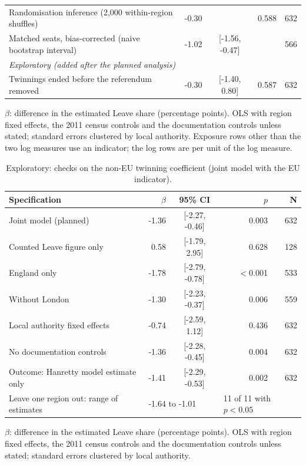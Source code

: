 \documentclass[11pt,a4paper]{article}
\begin{document}
\begin{table}[H]
\begin{threeparttable}
\begin{tabular}{p{8.2cm}rcrr}
Randomisation inference (2,000 within-region shuffles) & -0.30 & & 0.588 & 632\\
Matched seats, bias-corrected (naive bootstrap interval) & -1.02 & [-1.56, -0.47] & & 566\\
\midrule\multicolumn{5}{l}{\textit{Exploratory (added after the planned analysis)}}\\
Twinnings ended before the referendum removed & -0.30 & [-1.40, 0.80] & 0.587 & 632\\
\bottomrule\end{tabular}\begin{tablenotes}\footnotesize\item $\beta$: difference in the estimated Leave share (percentage points). OLS with region fixed effects, the 2011 census controls and the documentation controls unless stated; standard errors clustered by local authority. Exposure rows other than the two log measures use an indicator; the log rows are per unit of the log measure.\end{tablenotes}\end{threeparttable}\end{table}

\begin{table}[H]\centering\footnotesize\begin{threeparttable}\caption{Exploratory: checks on the non-EU twinning coefficient (joint model with the EU indicator).}\label{tab:noneu}\begin{tabular}{p{8.2cm}rcrr}\toprule Specification & $\beta$ & 95\% CI & $p$ & N\\\midrule
Joint model (planned) & -1.36 & [-2.27, -0.46] & 0.003 & 632\\
Counted Leave figure only & 0.58 & [-1.79, 2.95] & 0.628 & 128\\
England only & -1.78 & [-2.79, -0.78] & $<$0.001 & 533\\
Without London & -1.30 & [-2.23, -0.37] & 0.006 & 559\\
Local authority fixed effects & -0.74 & [-2.59, 1.12] & 0.436 & 632\\
No documentation controls & -1.36 & [-2.28, -0.45] & 0.004 & 632\\
Outcome: Hanretty model estimate only & -1.41 & [-2.29, -0.53] & 0.002 & 632\\
Leave one region out: range of estimates & \multicolumn{2}{l}{-1.64 to -1.01} & \multicolumn{2}{l}{11 of 11 with $p<0.05$}\\
\bottomrule\end{tabular}\begin{tablenotes}\footnotesize\item $\beta$: difference in the estimated Leave share (percentage points). OLS with region fixed effects, the 2011 census controls and the documentation controls unless stated; standard errors clustered by local authority.\end{tablenotes}\end{threeparttable}\end{table}
\end{document}

